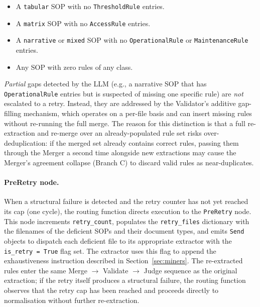 ﻿\documentclass[11pt]{article}
\begin{document}
\begin{itemize}
    \item A \texttt{tabular} SOP with no \texttt{ThresholdRule} entries.
    \item A \texttt{matrix} SOP with no \texttt{AccessRule} entries.
    \item A \texttt{narrative} or \texttt{mixed} SOP with no \texttt{OperationalRule}
          or \texttt{MaintenanceRule} entries.
    \item Any SOP with zero rules of any class.
\end{itemize}

\emph{Partial} gaps detected by the LLM (e.g., a narrative SOP that has
\texttt{OperationalRule} entries but is suspected of missing one specific rule)
are \emph{not} escalated to a retry.  Instead, they are addressed by the
Validator's additive gap-filling mechanism, which operates on a per-file basis
and can insert missing rules without re-running the full merge.  The reason for
this distinction is that a full re-extraction and re-merge over an already-populated
rule set risks over-deduplication: if the merged set already contains correct rules,
passing them through the Merger a second time alongside new extractions may cause
the Merger's agreement collapse (Branch C) to discard valid rules as near-duplicates.

\paragraph{PreRetry node.}
When a structural failure is detected and the retry counter has not yet reached
its cap (one cycle), the routing function directs execution to the
\texttt{PreRetry} node.  This node increments \texttt{retry\_count},
populates the \texttt{retry\_files} dictionary with the filenames of the
deficient SOPs and their document types, and emits \texttt{Send} objects to
dispatch each deficient file to its appropriate extractor with the
\texttt{is\_retry = True} flag set.  The extractor uses this flag to append the
exhaustiveness instruction described in Section~\ref{sec:miners}.  The
re-extracted rules enter the same Merge $\to$ Validate $\to$ Judge sequence as
the original extraction; if the retry itself produces a structural failure, the
routing function observes that the retry cap has been reached and proceeds
directly to normalisation without further re-extraction.

\end{document}

